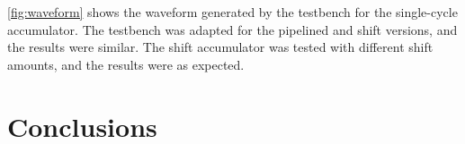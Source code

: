 \documentclass[a4paper,12pt]{article}
\begin{document}
\ref{fig:waveform} shows the waveform generated by the testbench for the single-cycle accumulator. The testbench was adapted for the pipelined and shift versions, and the results were similar. The shift accumulator was tested with different shift amounts, and the results were as expected.

\section{Conclusions}
\end{document}
